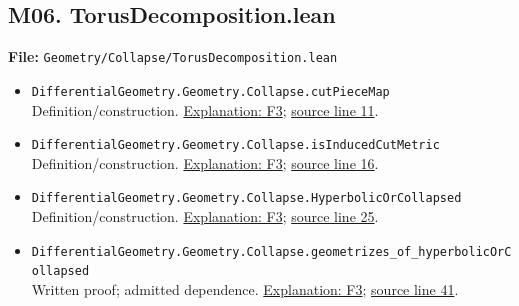 \documentclass[
  letterpaper,
  11pt]{article}
\begin{document}

\subsection{M06.
TorusDecomposition.lean}\label{m06.-torusdecomposition.lean}

\textbf{File:}
{\small\texttt{Geometry/\allowbreak{}Collapse/\allowbreak{}Torus\allowbreak{}Decomposition.\allowbreak{}lean}}

\begin{itemize}
\item
  {\small\texttt{Differential\allowbreak{}Geometry.\allowbreak{}Geometry.\allowbreak{}Collapse.\allowbreak{}cut\allowbreak{}Piece\allowbreak{}Map}}\\
  Definition/construction. \hyperref[f3-induced-cut-metric]{Explanation:
  F3};
  \href{https://github.com/qinz1yang/differential-geometry-dev/blob/ea0fae60ee01ef8c8d9b57a51794c6538f679c5d/DifferentialGeometry/Geometry/Collapse/TorusDecomposition.lean\#L11}{source
  line 11}.
\item
  {\small\texttt{Differential\allowbreak{}Geometry.\allowbreak{}Geometry.\allowbreak{}Collapse.\allowbreak{}is\allowbreak{}Induced\allowbreak{}Cut\allowbreak{}Metric}}\\
  Definition/construction. \hyperref[f3-induced-cut-metric]{Explanation:
  F3};
  \href{https://github.com/qinz1yang/differential-geometry-dev/blob/ea0fae60ee01ef8c8d9b57a51794c6538f679c5d/DifferentialGeometry/Geometry/Collapse/TorusDecomposition.lean\#L16}{source
  line 16}.
\item
  {\small\texttt{Differential\allowbreak{}Geometry.\allowbreak{}Geometry.\allowbreak{}Collapse.\allowbreak{}Hyperbolic\allowbreak{}Or\allowbreak{}Collapsed}}\\
  Definition/construction. \hyperref[f3-induced-cut-metric]{Explanation:
  F3};
  \href{https://github.com/qinz1yang/differential-geometry-dev/blob/ea0fae60ee01ef8c8d9b57a51794c6538f679c5d/DifferentialGeometry/Geometry/Collapse/TorusDecomposition.lean\#L25}{source
  line 25}.
\item
  {\small\texttt{Differential\allowbreak{}Geometry.\allowbreak{}Geometry.\allowbreak{}Collapse.\allowbreak{}geometrizes\_\allowbreak{}of\_\allowbreak{}hyperbolic\allowbreak{}Or\allowbreak{}Collapsed}}\\
  Written proof; admitted dependence.
  \hyperref[f3-induced-cut-metric]{Explanation: F3};
  \href{https://github.com/qinz1yang/differential-geometry-dev/blob/ea0fae60ee01ef8c8d9b57a51794c6538f679c5d/DifferentialGeometry/Geometry/Collapse/TorusDecomposition.lean\#L41}{source
  line 41}.
\end{itemize}
\end{document}
